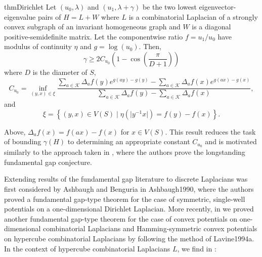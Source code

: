 \begin{restatable}{thm}{Dirichlet}\label{thm:Dirichlet}
	Let $(u_0, \lambda)$ and $(u_1, \lambda+\gamma)$ be the two lowest eigenvector-eigenvalue pairs of $H=L+W$ where $L$ is a combinatorial Laplacian of a strongly convex subgraph of an invariant homogeneous graph and $W$ is a diagonal positive-semidefinite matrix. Let the componentwise ratio $f=u_1/u_0$ have modulus of continuity $\eta$ and $g = \log(u_0)$. Then, 
	\begin{equation*}
		\gamma \geq 2 C_{u_0} \left(1-\cos\left(\frac{\pi}{D+1} \right)\right)
	\end{equation*}
	where $D$ is the diameter of $S$,
	\begin{equation*}
	C_{u_0} = \inf_{(y,x)\in \xi}\frac{\displaystyle \sum_{a\in\mathcal{K}}\Delta_a f(y)e^{g(ay)-g(y)} -\sum_{a\in\mathcal{K}}\Delta_a f(x)e^{g(ax)-g(x)}}{\displaystyle\sum_{a\in\mathcal{K}}\Delta_a f(y)-\sum_{a\in\mathcal{K}}\Delta_a f(x)},
	\end{equation*}	
	and 
	\begin{equation*}	
	\xi = \left\{\left(y,x\right) \in V(S) \; \vert \; \eta\left(\lvert y^{-1}x\rvert\right)= f(y)-f(x)\right\}.
	\end{equation*}
\end{restatable}  
Above, $\Delta_a f(x) = f(ax)-f(x)$ for $x \in V(S)$. This result reduces the task of bounding $\gamma(H)$ to determining an appropriate constant $C_{u_0}$ and is motivated similarly to the approach taken in \cite{Andrews2011}, where the authors prove the longstanding fundamental gap conjecture. 
 
 Extending results of the fundamental gap literature to discrete Laplacians was first considered by Ashbaugh and Benguria in {Ashbaugh1990}, where the authors proved a fundamental gap-type theorem for the case of symmetric, single-well potentials on a one-dimensional Dirichlet Laplacian. More recently, in \cite{Jarret2014c} we proved another fundamental gap-type theorem for the case of convex potentials on one-dimensional combinatorial Laplacians and Hamming-symmetric convex potentials on hypercube combinatorial Laplacians by following the method of {Lavine1994a}. In the context of hypercube combinatorial Laplacians $L$, we find in :
 
